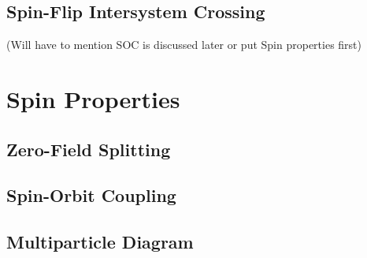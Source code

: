 \subsection{Spin-Flip Intersystem Crossing}
(Will have to mention SOC is discussed later or put Spin properties first)

\section{Spin Properties}
\subsection{Zero-Field Splitting}

\subsection{Spin-Orbit Coupling}

\subsection{Multiparticle Diagram}
